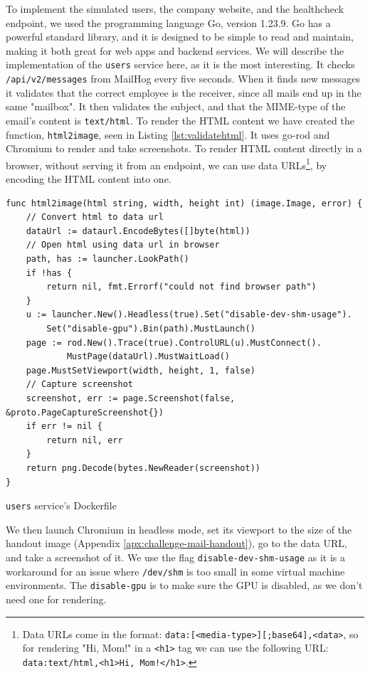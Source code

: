 To implement the simulated users, the company website, and the healthcheck endpoint, we used the programming language Go\cite{github__golang}, version 1.23.9. Go has a powerful standard library, and it is designed to be simple to read and maintain, making it both great for web apps and backend services. We will describe the implementation of the \texttt{users} service here, as it is the most interesting. It checks \texttt{/api/v2/messages} from MailHog every five seconds. When it finds new messages it validates that the correct employee is the receiver, since all mails end up in the same "mailbox". It then validates the subject, and that the MIME-type of the email's content is \texttt{text/html}. To render the HTML content we have created the function, \texttt{html2image}, seen in Listing  \ref{lst:validatehtml}. It uses go-rod and Chromium to render and take screenshots. To render HTML content directly in a browser, without serving it from an endpoint, we can use data URLs\footnote{Data URLs come in the format: \texttt{data:[<media-type>][;base64],<data>}, so for rendering "Hi, Mom!" in a \texttt{<h1>} tag we can use the following URL: \texttt{data:text/html,<h1>Hi, Mom!</h1>}.}, by encoding the HTML content into one.

\begin{listing}[H]
  \begin{verbatim}
func html2image(html string, width, height int) (image.Image, error) {
    // Convert html to data url
    dataUrl := dataurl.EncodeBytes([]byte(html))
    // Open html using data url in browser
    path, has := launcher.LookPath()
    if !has {
        return nil, fmt.Errorf("could not find browser path")
    }
    u := launcher.New().Headless(true).Set("disable-dev-shm-usage").
        Set("disable-gpu").Bin(path).MustLaunch()
    page := rod.New().Trace(true).ControlURL(u).MustConnect().
            MustPage(dataUrl).MustWaitLoad()
    page.MustSetViewport(width, height, 1, false)
    // Capture screenshot
    screenshot, err := page.Screenshot(false, &proto.PageCaptureScreenshot{})
    if err != nil {
        return nil, err
    }
    return png.Decode(bytes.NewReader(screenshot))
}
       \end{verbatim}
  \vspace{-1.5\baselineskip} %
 \caption{\texttt{users} service's Dockerfile}
\label{lst:validatehtml}
\end{listing}

We then launch Chromium in headless mode, set its viewport to the size of the handout image (Appendix \ref{apx:challenge-mail-handout}), go to the data URL, and take a screenshot of it. We use the flag \texttt{disable-dev-shm-usage} as it is a workaround for an issue where \texttt{/dev/shm} is too small in some virtual machine environments\cite{chrome_issue}. The \texttt{disable-gpu} is to make sure the GPU is disabled, as we don't need one for rendering. 

